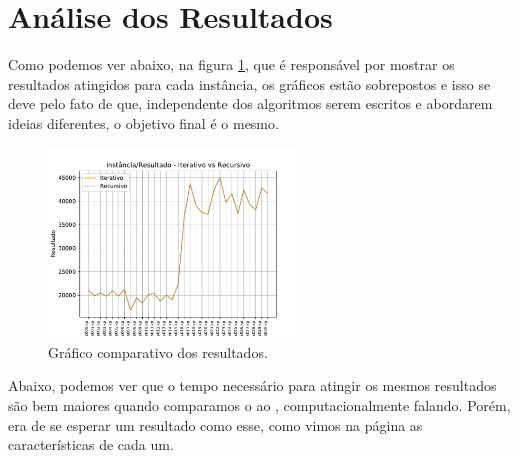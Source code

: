 \documentclass[a4paper, 12pt]{article}
\begin{document}
\section{Análise dos Resultados}
Como podemos ver abaixo, na figura \ref{fig:result_two}, que é responsável por mostrar os resultados atingidos
para cada instância, os gráficos estão sobrepostos e isso se deve pelo fato de que, independente dos algoritmos
serem escritos e abordarem ideias diferentes, o objetivo final é o mesmo.
\begin{figure}[!h]
    \centering
    \includegraphics[width=0.6\textwidth]{../img/result_two.pdf}
    \caption{Gráfico comparativo dos resultados.}
    \label{fig:result_two}
\end{figure}

Abaixo, podemos ver que o tempo necessário para atingir os mesmos resultados são bem maiores quando
comparamos o  ao , computacionalmente falando. Porém, era de
se esperar um resultado como esse, como vimos na página \pageref{sec:introducao} as características de cada um.
\end{document}
